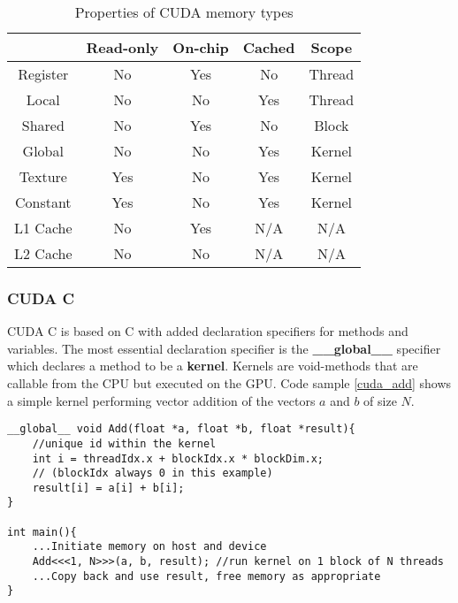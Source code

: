 \begin{table}[h!]
\centering
\begin{tabular}{ | c | c | c | c | c | }
  \hline
           & Read-only & On-chip   & Cached & Scope  \\ \hline
  Register & No        & Yes       & No     & Thread \\ \hline
  Local    & No        & No        & Yes    & Thread \\ \hline
  Shared   & No        & Yes       & No     & Block  \\ \hline
  Global   & No        & No        & Yes    & Kernel \\ \hline
  Texture  & Yes       & No        & Yes    & Kernel \\ \hline
  Constant & Yes       & No        & Yes    & Kernel \\ \hline
  L1 Cache & No        & Yes       & N/A    & N/A    \\ \hline
  L2 Cache & No        & No        & N/A    & N/A    \\ \hline

\end{tabular}
\caption{Properties of CUDA memory types\label{table:memorytypes}}
\end{table}

\subsubsection{CUDA C}
CUDA C is based on C with added declaration specifiers for methods and variables. 
The most essential declaration specifier is the \textbf{\_\_global\_\_} specifier which declares a method to be a \textbf{kernel}. 
Kernels are void-methods that are callable from the CPU but executed on the GPU. 
Code sample \ref{cuda_add} shows a simple kernel performing vector addition of the vectors $a$ and $b$ of size $N$.

\begin{lstlisting}[language=cudac, caption=CUDA C addition kernel, label=cuda_add]
__global__ void Add(float *a, float *b, float *result){
	//unique id within the kernel
	int i = threadIdx.x + blockIdx.x * blockDim.x;
	// (blockIdx always 0 in this example)
	result[i] = a[i] + b[i];
}

int main(){
	...Initiate memory on host and device
	Add<<<1, N>>>(a, b, result); //run kernel on 1 block of N threads
	...Copy back and use result, free memory as appropriate
}
\end{lstlisting}

